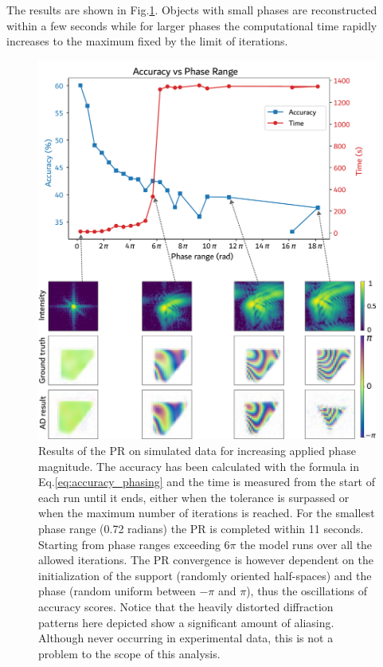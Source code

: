 The results are shown in Fig.\ref{fig:ad_sim_figs}. Objects with small phases are reconstructed within a few seconds while 
for larger phases the computational time rapidly increases to the maximum fixed by the limit of iterations.  

\begin{figure}[H]
  \centering
  \includegraphics[width=\textwidth]{figures/AD/ad_acc_time.pdf}
  \caption{Results of the PR on simulated data for increasing applied phase magnitude. The accuracy has been 
  calculated with the formula in Eq.\ref{eq:accuracy_phasing} and the time is measured from the start of each run 
  until it ends, either when the tolerance is surpassed or when the maximum number of iterations is reached. For the smallest 
  phase range (0.72 radians) the PR is completed within 11 seconds. Starting from phase ranges exceeding 6$\pi$ the 
  model runs over all the allowed iterations. The PR convergence is however dependent on the initialization of the 
  support (randomly oriented half-spaces) and the phase (random uniform between $-\pi$ and $\pi$), thus the 
  oscillations of accuracy scores. Notice that the heavily distorted diffraction patterns here depicted show a significant
  amount of aliasing. Although never occurring in experimental data, this is not a problem to the scope of this analysis. }
  \label{fig:ad_sim_figs}
\end{figure}

